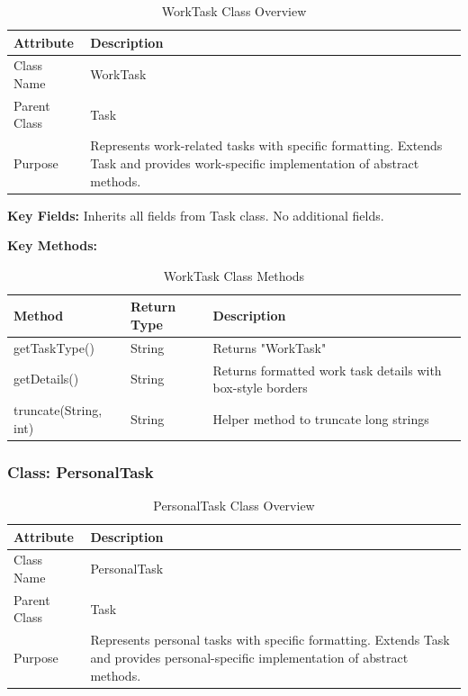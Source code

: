 \documentclass[12pt,a4paper]{article}
\begin{document}
\begin{table}[H]
\centering
\begin{tabular}{|l|p{10cm}|}
\hline
\textbf{Attribute} & \textbf{Description} \\
\hline
Class Name & WorkTask \\
\hline
Parent Class & Task \\
\hline
Purpose & Represents work-related tasks with specific formatting. Extends Task and provides work-specific implementation of abstract methods. \\
\hline
\end{tabular}
\caption{WorkTask Class Overview}
\end{table}

\textbf{Key Fields:} Inherits all fields from Task class. No additional fields.

\textbf{Key Methods:}

\begin{table}[H]
\centering
\begin{tabular}{|l|l|p{7cm}|}
\hline
\textbf{Method} & \textbf{Return Type} & \textbf{Description} \\
\hline
getTaskType() & String & Returns "WorkTask" \\
\hline
getDetails() & String & Returns formatted work task details with box-style borders \\
\hline
truncate(String, int) & String & Helper method to truncate long strings \\
\hline
\end{tabular}
\caption{WorkTask Class Methods}
\end{table}

\subsubsection{Class: PersonalTask}

\begin{table}[H]
\centering
\begin{tabular}{|l|p{10cm}|}
\hline
\textbf{Attribute} & \textbf{Description} \\
\hline
Class Name & PersonalTask \\
\hline
Parent Class & Task \\
\hline
Purpose & Represents personal tasks with specific formatting. Extends Task and provides personal-specific implementation of abstract methods. \\
\hline
\end{tabular}
\caption{PersonalTask Class Overview}
\end{table}
\end{document}

